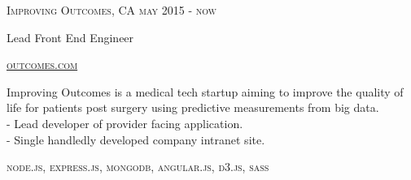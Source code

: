 {
    \textsc{\small{Improving Outcomes, CA
        \hfill
            {\raggedleft
                may 2015 - now
            } \\
        }
    }
    {\raggedright\large {
        Lead Front End Engineer
    } \\}

    \textsc{\small\href{http://www.outcomes.com}{outcomes.com}}

    \normalsize{
        Improving Outcomes is a medical tech startup aiming to improve the quality of life for patients post surgery using predictive measurements from big data. \\
        - Lead developer of provider facing application. \\
        - Single handledly developed company intranet site.
    }

    \textsc{\small{\color{highlight}
        node.js,
        express.js,
        mongodb,
        angular.js,
        d3.js,
        sass
    }}
}
